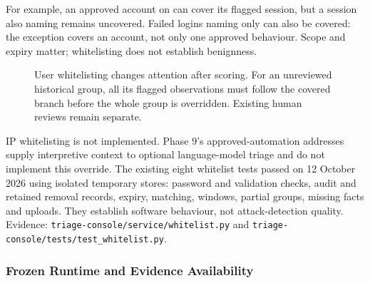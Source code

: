 \documentclass[11pt,a4paper]{article}
\newcommand{\tok}[1]{\texttt{\detokenize{#1}}}
\begin{document}
For example, an approved \tok{backup} account on \tok{host-a} can cover its flagged session, but a session also naming \tok{root} remains uncovered. Failed logins naming only \tok{backup} can also be covered: the exception covers an account, not only one approved behaviour. Scope and expiry matter; whitelisting does not establish benignness.

\begin{figure}[H]
\centering
{}
\caption{User whitelisting changes attention after scoring. For an unreviewed historical group, all its flagged observations must follow the covered branch before the whole group is overridden. Existing human reviews remain separate.}
\label{fig:whitelist-flow}
\end{figure}

IP whitelisting is not implemented. Phase 9's approved-automation addresses supply interpretive context to optional language-model triage and do not implement this override. The existing eight whitelist tests passed on 12 October 2026 using isolated temporary stores: password and validation checks, audit and retained removal records, expiry, matching, windows, partial groups, missing facts and uploads. They establish software behaviour, not attack-detection quality. Evidence: \nolinkurl{triage-console/service/whitelist.py} and \nolinkurl{triage-console/tests/test_whitelist.py}.

\subsubsection{Frozen Runtime and Evidence Availability}\label{sec:frozen-runtime}
\end{document}
